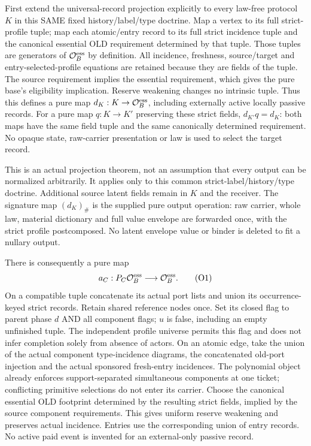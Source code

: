 \documentclass[11pt]{article}
\begin{document}
First extend the universal-record projection explicitly to every law-free protocol $K$ in this SAME fixed history/label/type doctrine. Map a vertex to its full strict-profile tuple; map each atomic/entry record to its full strict incidence tuple and the canonical essential OLD requirement determined by that tuple. Those tuples are generators of $\mathcal O_B^{\rm ess}$ by definition. All incidence, freshness, source/target and entry-selected-profile equations are retained because they are fields of the tuple. The source requirement implies the essential requirement, which gives the pure base's eligibility implication. Reserve weakening changes no intrinsic tuple. Thus this defines a pure map $d_K:K\to\mathcal O_B^{\rm ess}$, including externally active locally passive records. For a pure map $q:K\to K'$ preserving these strict fields, $d_{K'}q=d_K$: both maps have the same field tuple and the same canonically determined requirement. No opaque state, raw-carrier presentation or law is used to select the target record.

This is an actual projection theorem, not an assumption that every output can be normalized arbitrarily. It applies only to this common strict-label/history/type doctrine. Additional source latent fields remain in $K$ and the receiver. The signature map $(d_K)_\#$ is the supplied pure output operation: raw carrier, whole law, material dictionary and full value envelope are forwarded once, with the strict profile postcomposed. No latent envelope value or binder is deleted to fit a nullary output.

There is consequently a pure map
\[
             a_C:P_C\mathcal O_B^{\rm ess}\longrightarrow\mathcal O_B^{\rm ess}. \tag{O1}
\]
On a compatible tuple concatenate its actual port lists and union its occurrence-keyed strict records. Retain shared reference nodes once. Set its closed flag to parent phase $d$ AND all component flags; $u$ is false, including an empty unfinished tuple. The independent profile universe permits this flag and does not infer completion solely from absence of actors. On an atomic edge, take the union of the actual component type-incidence diagrams, the concatenated old-port injection and the actual sponsored fresh-entry incidences. The polynomial object already enforces support-separated simultaneous components at one ticket; conflicting primitive selections do not enter its carrier. Choose the canonical essential OLD footprint determined by the resulting strict fields, implied by the source component requirements. This gives uniform reserve weakening and preserves actual incidence. Entries use the corresponding union of entry records. No active paid event is invented for an external-only passive record.
\end{document}
